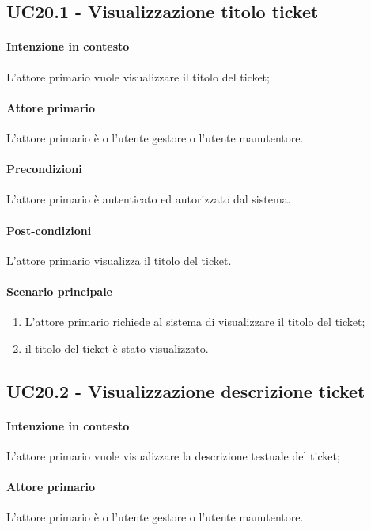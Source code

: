 \subsection{UC20.1 - Visualizzazione titolo ticket}\label{uc:20.1}

\paragraph{Intenzione in contesto} L'attore primario vuole visualizzare il titolo del ticket;
\paragraph{Attore primario} L'attore primario è o l'utente gestore o l'utente manutentore.
\paragraph{Precondizioni}  L'attore primario è autenticato ed autorizzato dal sistema.
\paragraph{Post-condizioni} L'attore primario visualizza il titolo del ticket.
\paragraph{Scenario principale}
\begin{enumerate}
    \item L'attore primario richiede al sistema di visualizzare il titolo del ticket;
    \item il titolo del ticket è stato visualizzato.
\end{enumerate}

\subsection{UC20.2 - Visualizzazione descrizione ticket}\label{uc:20.2}

\paragraph{Intenzione in contesto} L'attore primario vuole visualizzare la descrizione testuale del ticket;
\paragraph{Attore primario} L'attore primario è o l'utente gestore o l'utente manutentore.
